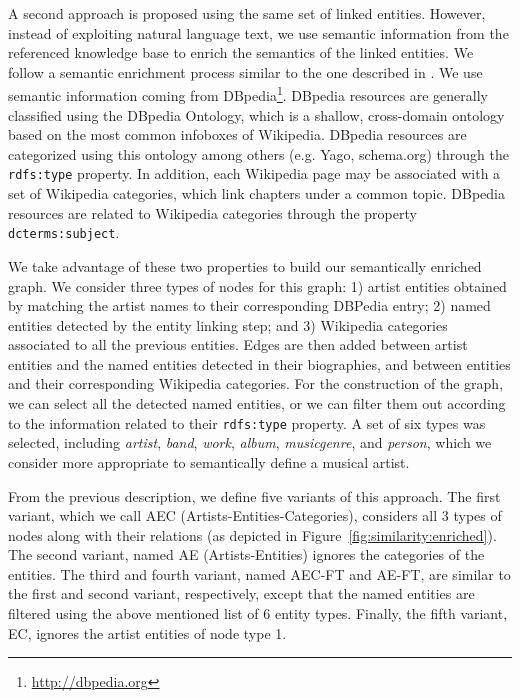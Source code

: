 A second approach is proposed using the same set of linked entities. However, instead of exploiting natural language text, we use semantic information from the referenced knowledge base to enrich the semantics of the linked entities. We follow a semantic enrichment process similar to the one described in \cite{Ostuni2015}. We use semantic information coming from DBpedia\footnote{\url{http://dbpedia.org}}. DBpedia resources are generally classified using the DBpedia Ontology, which is a shallow, cross-domain ontology based on the most common infoboxes of Wikipedia. DBpedia resources are categorized using this ontology among others (e.g. Yago, schema.org) through the \texttt{rdfs:type} property. In addition, each Wikipedia page may be associated with a set of Wikipedia categories, which link chapters under a common topic. DBpedia resources are related to Wikipedia categories through the property \texttt{dcterms:subject}.

We take advantage of these two properties to build our semantically enriched graph.
We consider three types of nodes for this graph: 1) 	artist entities obtained by matching the artist names to their corresponding DBPedia entry; 2) named entities detected by the entity linking step; and 3) Wikipedia categories associated to all the previous entities.
Edges are then added between artist entities and the named entities detected in their biographies, and between entities and their corresponding Wikipedia categories.
For the construction of the graph, we can select all the detected named entities, or we can filter them out according to the information related to their \texttt{rdfs:type} property. A set of six types was selected, including \textit{artist}, \textit{band}, \textit{work}, \textit{album}, \textit{musicgenre}, and \textit{person}, which we consider more appropriate to semantically define a musical artist.

From the previous description, we define five variants of this approach. The first variant, which we call AEC (Artists-Entities-Categories), considers all 3 types of nodes along with their relations (as depicted in Figure~\ref{fig:similarity:enriched}). The second variant, named AE (Artists-Entities) ignores the categories of the entities. The third and fourth variant, named AEC-FT and AE-FT, are similar to the first and second variant, respectively, except that the named entities are filtered using the above mentioned list of 6 entity types. Finally, the fifth variant, EC, ignores the artist entities of node type 1.

